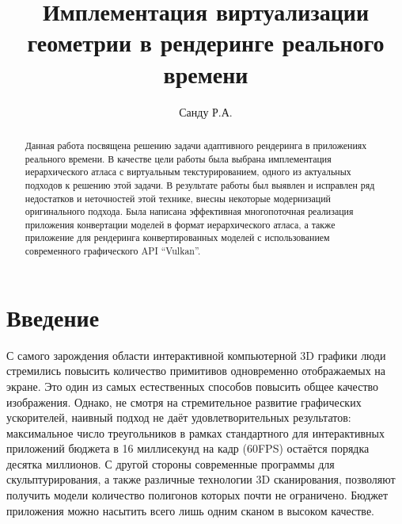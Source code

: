 \documentclass[12pt]{extarticle}
\begin{document}
\title{Имплементация виртуализации геометрии в рендеринге реального времени}

\author[1]{Санду Р.А.}

\maketitle
\begin{abstract}
Данная работа посвящена решению задачи адаптивного рендеринга в приложениях реального времени. В качестве цели работы была выбрана имплементация иерархического атласа с виртуальным текстурированием, одного из актуальных подходов к решению этой задачи. В результате работы был выявлен и исправлен ряд недостатков и неточностей этой технике, внесны некоторые модернизаций оригинального подхода. Была написана эффективная многопоточная реализация приложения конвертации моделей в формат иерархического атласа, а также приложение для рендеринга конвертированных моделей с использованием современного графического API ``Vulkan''.
\end{abstract}
\thispagestyle{empty}

\newpage
\tableofcontents
\newpage

\section{Введение}
\label{sec:intro}
С самого зарождения области интерактивной компьютерной 3D графики люди стремились повысить количество примитивов одновременно отображаемых на экране. Это один из самых естественных способов повысить общее качество изображения. Однако, не смотря на стремительное развитие графических ускорителей, наивный подход не даёт удовлетворительных результатов: максимальное число треугольников в рамках стандартного для интерактивных приложений бюджета в 16 миллисекунд на кадр (60FPS) остаётся порядка десятка миллионов. С другой стороны современные программы для скульптурирования, а также различные технологии 3D сканирования, позволяют получить модели количество полигонов которых почти не ограничено. Бюджет приложения можно насытить всего лишь одним сканом в высоком качестве.
\end{document}
